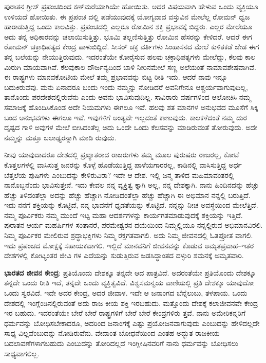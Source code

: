 ಪುರಾತನ ಗ್ರೀಸ್ ಪ್ರಪಂಚದಿಂದ ಕಣ್​ಮರೆಯಾಗಿಯೇ ಹೋಯಿತು. ಅದರ ವಿಷಯವಾಗಿ ಹೇಳುವ ಒಂದು ವ್ಯಕ್ತಿಯೂ ಉಳಿಯದೆ ಹೋಯಿತು. ಈ ಪ್ರಪಂಚ ದಲ್ಲಿ ಪಡೆಯುವುದಕ್ಕೆ ಯೋಗ್ಯವಾದ ವಸ್ತುವಿನ ಮೇಲೆಲ್ಲ ರೋಮನ್ ಧ್ವಜ ಹಾರಾಡುತ್ತಿದ್ದ ಒಂದು ಕಾಲವಿತ್ತು. ಪ್ರಪಂಚದಲ್ಲಿ ಎಲ್ಲರೂ ರೋಮಿನ ಶಕ್ತಿ ಪ್ರಭಾವಕ್ಕೆ ಬಿದ್ದರು. ಎಲ್ಲರ ಮೇಲೆಯೂ ಅದು ತನ್ನ ಅಧಿಕಾರವನ್ನು ಚಲಾಯಿಸುತ್ತಿತ್ತು. ಭೂಮಿ ತಲ್ಲಣಿಸುತ್ತಿತ್ತು ರೋಮಿನ ಹೆಸರನ್ನು ಕೇಳಿದರೆ. ಆದರೆ ಈಗ ರೋಮನ್ ಚಕ್ರಾಧಿಪತ್ಯದ ಕೇಂದ್ರ ಪಾಳುಬಿದ್ದಿದೆ. ಸೀಸರ್ ಚಕ್ರ ವರ್ತಿಗಳು ಸಿಂಹಾಸನದ ಮೇಲೆ ಕುಳಿತಕಡೆ ಜೇಡ ಈಗ ತನ್ನ ಬಲೆಯನ್ನು ನೇಯುತ್ತಿರುವುದು. ಇದರಂತೆಯೇ ಕೋರೈಸುವ ಹಲವು ಚಕ್ರಾಧಿಪತ್ಯಗಳು ಮೇಲೆದ್ದು, ಕೆಲವು ಕಾಲ ಮಿರುಗಿ ಮಾಯವಾಗಿವೆ. ಕೆಲವುಕಾಲ ದೌರ್ಜನ್ಯದಿಂದ ಬಾಳಿ ನೀರಿನಮೇಲೆ ಸಣ್ಣ ಅಲೆಯಂತೆ ನಾಮಾವಶೇಷವಾಗಿವೆ. ಈ ರಾಷ್ಟ್ರಗಳು ಮಾನವಕೋಟಿಯ ಮೇಲೆ ತಮ್ಮ ಪ್ರಭಾವವನ್ನು ಬಿಟ್ಟ ರೀತಿ ಇದು. ಆದರೆ ನಾವು ಇನ್ನೂ ಬದುಕಿರುವೆವು. ಮನು ಏನಾದರೂ ಬಂದು ಇಂದು ನಮ್ಮನ್ನು ನೋಡಿದರೆ ಅವನಿಗೇನೂ ಆಶ್ಚರ್ಯವಾಗುವುದಿಲ್ಲ, ತಾನೊಂದು ಪರದೇಶದಲ್ಲಿರುವೆನು ಎಂದು ಅವನು ಭಾವಿಸುವುದಿಲ್ಲ. ಸಾವಿರಾರು ವರ್ಷಗಳಿಂದ ಆಲೋಚಿಸಿ ನಮ್ಮ ಸಮಾಜಕ್ಕೆ ಹೊಂದಿಸಿಕೊಂಡ ಅದೇ ನಿಯಮಗಳು ಈಗಲೂ ಇವೆ. ಹಲವು ಶತ ಮಾನಗಳ ಅನುಭವದ ಮೂಸೆಗೆ ಸಿಕ್ಕಿ ಬಂದ ಅನುಭವಗಳು ಈಗಲೂ ಇವೆ. ಇವುಗಳಿಗೆ ಅಂತ್ಯವೇ ಇಲ್ಲದಂತೆ ಕಾಣುವುದು. ಕಾಲಕಳೆದಂತೆ ನಮ್ಮ ದುರ ದೃಷ್ಟದ ಗಾಳಿ ಅವುಗಳ ಮೇಲೆ ಬೀಸಿದಂತೆಲ್ಲ ಅದು ಒಂದೇ ಒಂದು ಕೆಲಸವನ್ನು ಮಾಡಿರುವಂತೆ ತೋರುವುದು. ಅದೇ ನಮ್ಮನ್ನು ಮತ್ತೂ ಬಲಾಢ್ಯರನ್ನಾಗಿ ಮಾಡಿ ರುವುದು.

ನೀವು ಯಾವುದಾದರೂ ದೇಶದಲ್ಲಿ ಪ್ರಖ್ಯಾತರಾದ ರಾಜರುಗಳು ತಮ್ಮ ಮೂಲ ಪುರುಷರು ರಾಜರಲ್ಲ, ಕೋಟೆ ಕೊತ್ತಲಗಳಲ್ಲಿ ವಾಸಿಸುತ್ತ ಜನರನ್ನು ಕೊಳ್ಳೆ ಹೊಡೆಯುತ್ತಿದ್ದ ಪಾಳೆಯಗಾರರಲ್ಲ, ಕಾಡಿನಲ್ಲಿ ವಾಸಿಸುತ್ತಿದ್ದ ಅರ್ಧ ಬೆತ್ತಲೆಯ ಪುಷಿಗಳು ಎಂಬುದನ್ನು ಕೇಳಿರುವಿರಾ? ಇದೇ ಆ ದೇಶ. ಇಲ್ಲಿ ಜನ್ಮ ತಾಳಿದ ಮಹಿಮಾವಂತರಲ್ಲಿ ನಾನೊಬ್ಬನೆಂದು ಭಾವಿಸುತ್ತೇನೆ. ಇದು ಕೇವಲ ನನ್ನ ವ್ಯಕ್ತಿತ್ವ ಕ್ಕಾಗಿ ಅಲ್ಲ, ನನ್ನ ದೇಶಕ್ಕಾಗಿ. ನಾನು ಹಿಂದಿನದನ್ನು ಹೆಚ್ಚು ಹೆಚ್ಚು ತಿಳಿದಂತೆಲ್ಲಾ ಅದನ್ನು ಹೆಚ್ಚು ಹೆಚ್ಚಾಗಿ ನೋಡಿದಂತೆಲ್ಲಾ ಹೆಚ್ಚು ಹೆಚ್ಚಾಗಿ ಈ ಅಭಿಮಾನ ನನ್ನಲ್ಲಿ ಬರುತ್ತಿದೆ. ಇದು ನನಗೆ ಶಕ್ತಿಯನ್ನು ಕೊಟ್ಟಿದೆ, ನನ್ನ ಭಾವನೆಗೆ ಧೃಡತೆಯನ್ನು ಕೊಟ್ಟಿದೆ. ನನ್ನನ್ನು ನೀಚ ಅವಸ್ಥೆಯಿಂದ ಮೇಲೆತ್ತಿದೆ. ನಮ್ಮ ಪೂರ್ವಿಕರು ನಮ್ಮ ಮುಂದೆ ಇಟ್ಟ ಮಹಾ ಆದರ್ಶಗಳನ್ನು ಕಾರ್ಯಗತಮಾಡುವುದಕ್ಕೆ ಶಕ್ತಿಯನ್ನು ಇತ್ತಿದೆ. ಪುರಾತನ ಆರ್ಯ ಮಹರ್ಷಿಗಳ ಸಂತಾನರೆ, ಪರಮೇಶ್ವರನ ದಯೆಯಿಂದ ನಿಮ್ಮಲ್ಲಿಯೂ ನನ್ನಲ್ಲಿರುವ ಅಭಿಮಾನವಿರಲಿ. ನಿಮ್ಮ ಪೂರ್ವಿಕರ ಮೇಲಿರುವ ಶ್ರದ್ಧಾಭಕ್ತಿಗಳು ನಿಮ್ಮ ರಕ್ತಗತವಾಗಲಿ. ಅದು ನಿಮ್ಮ ಜೀವನದಲ್ಲಿ ಓತಪ್ರೋತ ವಾಗಲಿ. ಇದು ಪ್ರಪಂಚದ ಮೋಕ್ಷಕ್ಕೆ ಸಹಾಯಕವಾಗಲಿ. ಇಲ್ಲಿದೆ ಮಾನವನಿಗೆ ಜೀವನವನ್ನು ಕೊಡುವ ಅಮೃತಪ್ರವಾಹ–ಇತರ ದೇಶಗಳಲ್ಲಿ ಕೋಟ್ಯಂತರ ಜೀವಿ ಗಳ ಎದೆಯನ್ನು ಸುಡುತ್ತಿರುವ ಜಡಸಿದ್ಧಾಂತದ ದಳ್ಳುರಿ ಶಮನಕ್ಕೆ ಅಮೃತವಾರಿ.

\textbf{ಭಾರತದ ಜೀವನ ಕೇಂದ್ರ}: ಪ್ರತಿಯೊಂದು ದೇಶಕ್ಕೂ ತನ್ನದೇ ಆದ ಪಾತ್ರವಿದೆ. ಅದರಂತೆಯೇ ಪ್ರತಿಯೊಂದು ದೇಶಕ್ಕೂ ತನ್ನದೇ ಒಂದು ರೀತಿ ಇದೆ, ತನ್ನದೇ ಒಂದು ವ್ಯಕ್ತಿತ್ವವಿದೆ. ವಿಶ್ವಸಮನ್ವಯ ವಾಣಿಯಲ್ಲಿ ಪ್ರತಿ ದೇಶಕ್ಕೂ ಯಾವುದೋ ಒಂದು ಸ್ವರವಿದೆ. ಇದೇ ಅದರ ಕೇಂದ್ರ, ಅದರ ಜೀವಾಳ. ಇದೇ ಆ ಜನಾಂಗದ ಬೆನ್ನೆಲುಬು, ತಳಪಾಯ. ಒಂದು ದೇಶದಲ್ಲಿ ಇಂಗ್ಲೆಂಡಿನಲ್ಲಿರುವಂತೆ ಅದು ರಾಜ ಕೀಯ ಶಕ್ತಿ ಇರಬಹುದು. ಮತ್ತೊಂದು ದೇಶಕ್ಕೆ ಕಲಾಜೀವನವೇ ಕೇಂದ್ರ ಇರ ಬಹುದು. ಇದರಂತೆಯೇ ಬೇರೆ ಬೇರೆ ರಾಷ್ಟ್ರಗಳಿಗೆ ಬೇರೆ ಬೇರೆ ಕೇಂದ್ರಗಳಿರು ತ್ತವೆ. ನಾನು ಅಮೇರಿಕನ್ನರಿಗೆ ಧರ್ಮವನ್ನು ಬೋಧಿಸಬೇಕಾದರೂ, ಅದರಿಂದ ಜನಾಂಗಕ್ಕೆ ಎಷ್ಟು ಪ್ರಯೋಜನವಾಗುವುದು ಎಂಬುದನ್ನು ಹೇಳಿದಲ್ಲದೇ ಸಾಧ್ಯ ವಿಲ್ಲವೆಂಬುದನ್ನು ನೋಡಿರುವೆನು. ವೇದಾಂತ ಬೋಧನೆಯಿಂದ ಎಂತಹ ಅದ್ಭುತ ರಾಜಕೀಯ ಬದಲಾವಣೆಗಳಾಗಬಹುದು ಎಂಬುದನ್ನು ತೋರಿದಲ್ಲದೆ ಇಂಗ್ಲೀಷಿನವರಿಗೆ ನಾನು ಧರ್ಮವನ್ನು ಬೋಧಿಸಲು ಸಾಧ್ಯವಾಗಲಿಲ್ಲ.

